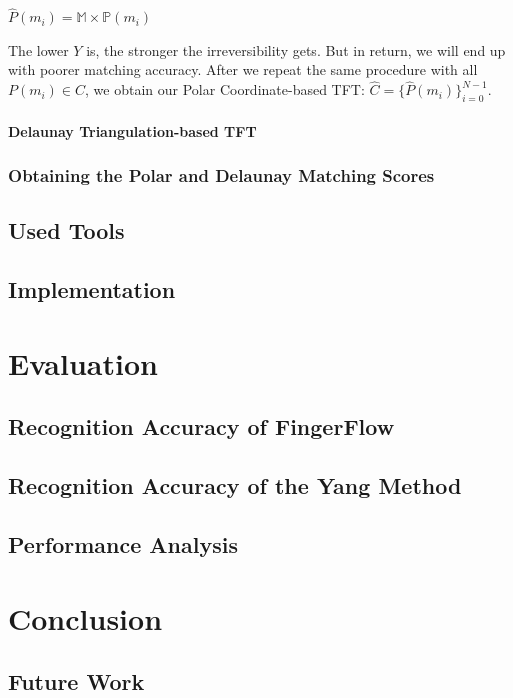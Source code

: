 \documentclass[fyp]{socreport}
\begin{document}
\begin{center}
	$\widehat{P}(m_i) = \mathbb{M} \times \mathbb{P}(m_i)$
\end{center}

 The lower $Y$ is, the stronger the irreversibility gets. But in return, we will end up with poorer matching accuracy. After we repeat the same procedure with all $P(m_i) \in C$, we obtain our Polar Coordinate-based TFT: $\widehat{C} = \{\widehat{P}(m_i)\}^{N-1}_{i=0}$.

\subsubsection{Delaunay Triangulation-based TFT}
\subsection{Obtaining the Polar and Delaunay Matching Scores}
\section{Used Tools}
\section{Implementation}

\chapter{Evaluation}
\section{Recognition Accuracy of FingerFlow}
\section{Recognition Accuracy of the Yang Method}
\section{Performance Analysis}

\chapter{Conclusion}


\section{Future Work}
\end{document}
